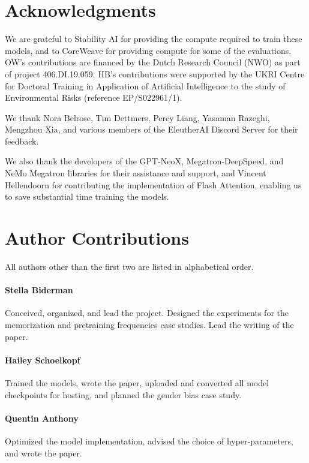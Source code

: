 \documentclass{article}
\theoremstyle{plain}
\theoremstyle{definition}
\theoremstyle{remark}
\begin{document}
\section*{Acknowledgments}

We are grateful to Stability AI for providing the compute required to train these models, and to CoreWeave for providing compute for some of the evaluations.
OW's contributions are financed by the Dutch Research Council (NWO) as part of project 406.DI.19.059. HB's contributions were supported by the UKRI Centre for Doctoral Training in Application of Artificial Intelligence to the study of Environmental Risks (reference EP/S022961/1).

We thank Nora Belrose, Tim Dettmers, Percy Liang, Yasaman Razeghi, Mengzhou Xia, and various members of the EleutherAI Discord Server for their feedback.

We also thank the developers of the GPT-NeoX, Megatron-DeepSpeed, and NeMo Megatron libraries for their assistance and support, and Vincent Hellendoorn for contributing the implementation of Flash Attention, enabling us to save substantial time training the models.





\newpage
\appendix 
\onecolumn

\section{Author Contributions}

All authors other than the first two are listed in alphabetical order.

\paragraph{Stella Biderman} Conceived, organized, and lead the project. Designed the experiments for the memorization and pretraining frequencies case studies. Lead the writing of the paper.

\paragraph{Hailey Schoelkopf} Trained the models, wrote the paper, uploaded and converted all model checkpoints for hosting, and planned the gender bias case study. 

\paragraph{Quentin Anthony} Optimized the model implementation, advised the choice of hyper-parameters, and wrote the paper.
\end{document}
